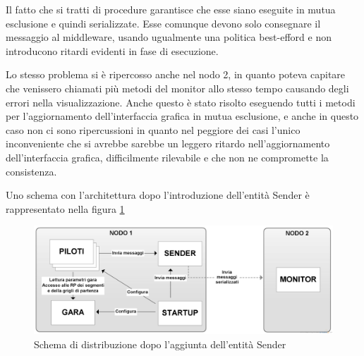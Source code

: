 \documentclass[a4paper,11pt, twoside]{book}
\begin{document}
      
      Il fatto che si tratti di procedure garantisce che esse siano eseguite in mutua esclusione e quindi serializzate.
      Esse comunque devono solo consegnare il messaggio al middleware, usando ugualmente una politica best-efford
      e non introducono ritardi evidenti in fase di esecuzione.
      
      Lo stesso problema si è ripercosso anche nel nodo 2, in quanto poteva capitare che venissero chiamati
      più metodi del monitor allo stesso tempo causando degli errori nella visualizzazione.
      Anche questo è stato risolto eseguendo tutti i metodi per l'aggiornamento dell'interfaccia grafica in mutua esclusione,
      e anche in questo caso non ci sono ripercussioni in quanto nel peggiore dei casi l'unico inconveniente che si avrebbe sarebbe
      un leggero ritardo nell'aggiornamento dell'interfaccia grafica, difficilmente rilevabile e che non ne compromette
      la consistenza.
      
      Uno schema con l'architettura dopo l'introduzione dell'entità Sender è rappresentato nella 
      figura \ref{Fig:SchemaDistribuzioneSender}
      
      \begin{figure}[h]
	\centering
	\includegraphics[width=120mm]{./Immagini/SchemaDistribuzioneSender.png}
	\caption{Schema di distribuzione dopo l'aggiunta dell'entità Sender}
	\label{Fig:SchemaDistribuzioneSender}
      \end{figure}      
      
\end{document}
